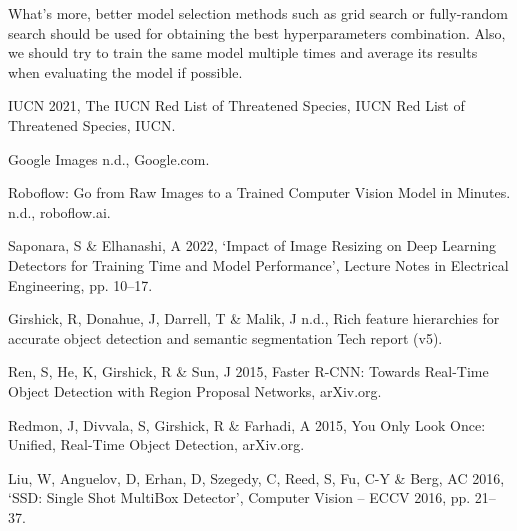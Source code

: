 \documentclass[runningheads]{llncs}
\begin{document}
What's more, better model selection methods such as grid search or fully-random search should be used for obtaining the best hyperparameters combination. Also, we should try to train the same model multiple times and average its results when evaluating the model if possible. 



\begin{thebibliography}{8}
IUCN 2021, The IUCN Red List of Threatened Species, IUCN Red List of Threatened Species, IUCN.

Google Images n.d., Google.com.

Roboflow: Go from Raw Images to a Trained Computer Vision Model in Minutes. n.d., roboflow.ai.

Saponara, S \& Elhanashi, A 2022, `Impact of Image Resizing on Deep Learning Detectors for Training Time and Model Performance', Lecture Notes in Electrical Engineering, pp. 10–17.

Girshick, R, Donahue, J, Darrell, T \& Malik, J n.d., Rich feature hierarchies for accurate object detection and semantic segmentation Tech report (v5).

Ren, S, He, K, Girshick, R \& Sun, J 2015, Faster R-CNN: Towards Real-Time Object Detection with Region Proposal Networks, arXiv.org.

Redmon, J, Divvala, S, Girshick, R \& Farhadi, A 2015, You Only Look Once: Unified, Real-Time Object Detection, arXiv.org.

Liu, W, Anguelov, D, Erhan, D, Szegedy, C, Reed, S, Fu, C-Y \& Berg, AC 2016, `SSD: Single Shot MultiBox Detector', Computer Vision – ECCV 2016, pp. 21–37.

\end{thebibliography}
\end{document}
